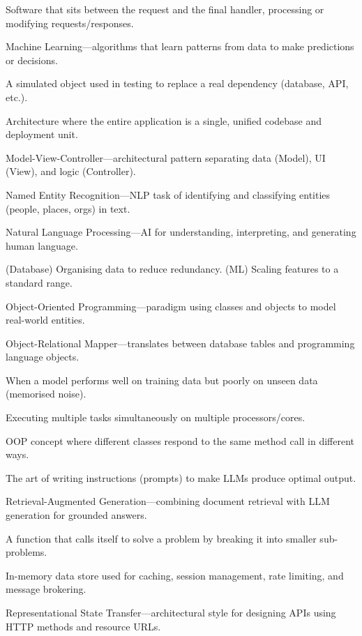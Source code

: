 \documentclass[12pt, a4paper, oneside]{book}
\begin{document}
\begin{description}[leftmargin=2em, style=nextline]
    \item[Middleware] Software that sits between the request and the final handler, processing or modifying requests/responses.
    \item[ML] Machine Learning---algorithms that learn patterns from data to make predictions or decisions.
    \item[Mock] A simulated object used in testing to replace a real dependency (database, API, etc.).
    \item[Monolith] Architecture where the entire application is a single, unified codebase and deployment unit.
    \item[MVC] Model-View-Controller---architectural pattern separating data (Model), UI (View), and logic (Controller).
    \item[NER] Named Entity Recognition---NLP task of identifying and classifying entities (people, places, orgs) in text.
    \item[NLP] Natural Language Processing---AI for understanding, interpreting, and generating human language.
    \item[Normalisation] (Database) Organising data to reduce redundancy. (ML) Scaling features to a standard range.
    \item[OOP] Object-Oriented Programming---paradigm using classes and objects to model real-world entities.
    \item[ORM] Object-Relational Mapper---translates between database tables and programming language objects.
    \item[Overfitting] When a model performs well on training data but poorly on unseen data (memorised noise).
    \item[Parallelism] Executing multiple tasks simultaneously on multiple processors/cores.
    \item[Polymorphism] OOP concept where different classes respond to the same method call in different ways.
    \item[Prompt Engineering] The art of writing instructions (prompts) to make LLMs produce optimal output.
    \item[RAG] Retrieval-Augmented Generation---combining document retrieval with LLM generation for grounded answers.
    \item[Recursion] A function that calls itself to solve a problem by breaking it into smaller sub-problems.
    \item[Redis] In-memory data store used for caching, session management, rate limiting, and message brokering.
    \item[REST] Representational State Transfer---architectural style for designing APIs using HTTP methods and resource URLs.

\end{description}
\end{document}
